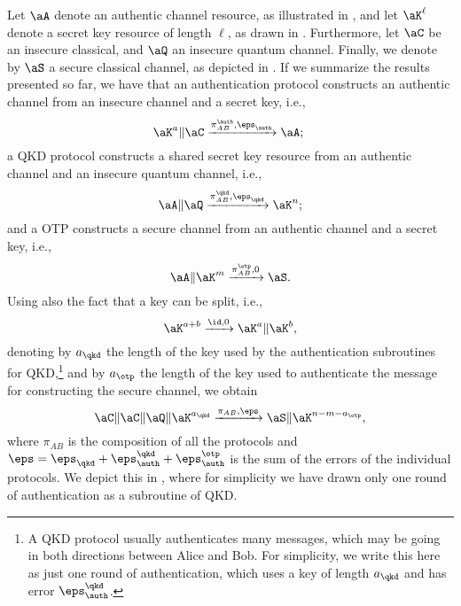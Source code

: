 Let $\aA$ denote an authentic channel resource, as illustrated in
, and let $\aK^{\ell}$ denote a secret key
resource of length $\ell$, as drawn in
. Furthermore, let $\aC$ be an insecure
classical, and $\aQ$ an insecure quantum channel. Finally, we denote by $\aS$ a secure classical channel, as depicted in
. If we summarize the results presented so
far, we have that an authentication protocol constructs an authentic
channel from an insecure channel and a secret key, i.e.,
\[ 
\aK^{a} \| \aC \xrightarrow{\pi^\auth_{AB},\eps_\auth}
\aA;\
\]
a QKD protocol constructs a shared secret key resource from an authentic channel and an insecure quantum channel, i.e., 
\[ 
\aA \| \aQ \xrightarrow{\pi^\qkd_{AB},\eps_\qkd}
\aK^n;\]
and a OTP constructs a secure channel from an authentic channel and a secret key, i.e., 
\[
 \aA \| \aK^m \xrightarrow{\pi^\otp_{AB},0} \aS.
\]
Using also the fact that a key can be split, i.e.,  
\[ 
  \aK^{a+b} \xrightarrow{\id,0} \aK^{a} \| \aK^b ,
  \]
denoting by $a_\qkd$ the length of the key used by the authentication subroutines for QKD,\footnote{A QKD protocol usually authenticates   many messages, which may be going in both directions between Alice and Bob. For   simplicity, we write this here as just one round of authentication, which uses a key of length $a_\qkd$ and has error   $\eps^\qkd_\auth$.} and by $a_\otp$ the length of the key used to authenticate the message for constructing the secure channel, we obtain
\[ 
\aC \| \aC \| \aQ \| \aK^{a_\qkd} \xrightarrow{\pi_{AB},\eps} \aS
\| \aK^{n-m-a_\otp} ,
\]
where $\pi_{AB}$ is the composition of all the protocols and $\eps = \eps_\qkd + \eps_\auth^\qkd + \eps_\auth^\otp$ is the sum of the errors of the individual protocols. We depict this in , where for simplicity we have drawn only one round of authentication as a subroutine of QKD.

